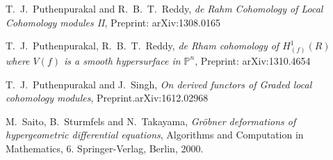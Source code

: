 \documentclass{amsart}
\theoremstyle{plain}
\theoremstyle{definition}
\theoremstyle{remark}
\begin{document}
\begin{thebibliography}{10}
 T.~J.~Puthenpurakal and R.~B.~T.~Reddy, 
\emph{de Rahm Cohomology of Local Cohomology modules II},
Preprint: arXiv:1308.0165 
 
 T.~J.~Puthenpurakal,  R.~B.~T.~Reddy, 
  \emph{de Rham cohomology of $H^1_{(f)}(R)$ where $V(f)$ is a smooth hypersurface in $\mathbb{P}^n$},
Preprint: arXiv:1310.4654 

   T.~J.~Puthenpurakal and J.~Singh,
  \emph{On derived functors  of Graded local cohomology modules},
  Preprint.arXiv:1612.02968
  
  M.~Saito, B.~Sturmfels and N.~Takayama, 
\emph{Gr\"{o}bner deformations of hypergeometric differential equations},
Algorithms and Computation in Mathematics, 6. Springer-Verlag, Berlin, 2000. 
\end{thebibliography}
\end{document}
